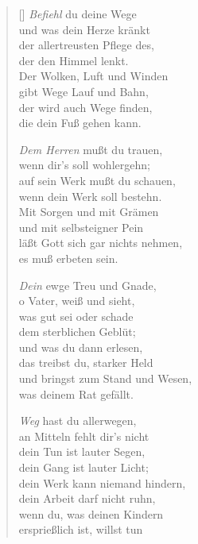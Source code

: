 \documentclass[fontsize=11pt]{scrartcl}
\begin{document}
                                                                                                        

\begin{multicols}{2}
\settowidth{\versewidth}{Befiehl du deine Wege und was}                                                  
\begin{verse}[\versewidth]                                                                                              
   \emph{Befiehl} du deine Wege\\
  und was dein Herze kränkt\\
  der allertreusten Pflege des,\\
  der den Himmel lenkt.\\
  Der Wolken, Luft und Winden\\
  gibt Wege Lauf und Bahn,\\
  der wird auch Wege finden,\\
  die dein Fuß gehen kann.
  
   \emph{Dem Herren} mußt du trauen,\\
  wenn dir's soll wohlergehn;\\
  auf sein Werk mußt du schauen,\\
  wenn dein Werk soll bestehn.\\
  Mit Sorgen und mit Grämen\\
  und mit selbsteigner Pein\\
  läßt Gott sich gar nichts nehmen,\\
  es muß erbeten sein.

  
   \emph{Dein} ewge Treu und Gnade,\\
  o Vater,  weiß und sieht,\\
  was gut sei oder schade\\
  dem sterblichen Geblüt;\\
  und was du dann erlesen,\\
  das treibst du, starker Held\\
  und bringst zum Stand und Wesen,\\
  was deinem Rat gefällt.
  
   \emph{Weg} hast du allerwegen,\\
  an Mitteln fehlt dir's nicht\\
  dein Tun ist lauter Segen,\\
  dein Gang ist lauter Licht;\\
  dein Werk kann niemand hindern,\\
  dein Arbeit darf nicht ruhn,\\
  wenn du, was deinen Kindern\\
  ersprießlich ist, willst tun


\end{verse}
\end{multicols}
\end{document}
